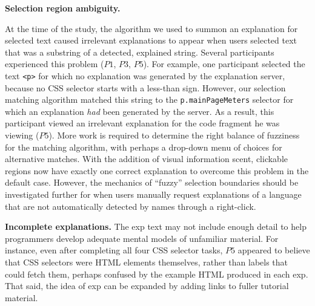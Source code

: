 {\bf Selection region ambiguity.}
\begin{changes}
At the time of the study, the algorithm we used to summon an explanation for selected text caused irrelevant explanations to appear when users selected text that was a substring of a detected, explained string.
Several participants experienced this problem ($P1$, $P3$, $P5$).
For example, one participant selected the text \texttt{<p>} for which no explanation was generated by the explanation server, because no CSS selector starts with a less-than sign.
However, our selection matching algorithm matched this string to the \texttt{p.mainPageMeters} selector for which an explanation \emph{had} been generated by the server.
As a result, this participant viewed an irrelevant explanation for the code fragment he was viewing ($P5$).
More work is required to determine the right balance of fuzziness for the matching algorithm, with perhaps a drop-down menu of choices for alternative matches.
\fi
With the addition of visual information scent, clickable regions now have exactly one correct explanation to overcome this problem in the default case.
However, the mechanics of ``fuzzy'' selection boundaries should be investigated further for when users manually request explanations of a language that are not automatically detected by \Glspl{name} through a right-click.
\end{changes}

{\bf Incomplete explanations.} The  \gls{exp} text may not include enough detail to help programmers  develop adequate mental models of unfamiliar material. For instance,
even after completing all four CSS selector tasks, $P5$ appeared to believe that CSS selectors were HTML elements themselves, rather than labels that could fetch them, perhaps confused by the example HTML produced in each \gls{exp}.
That said, the idea of \gls{exp} can be expanded by adding links to fuller tutorial material.
